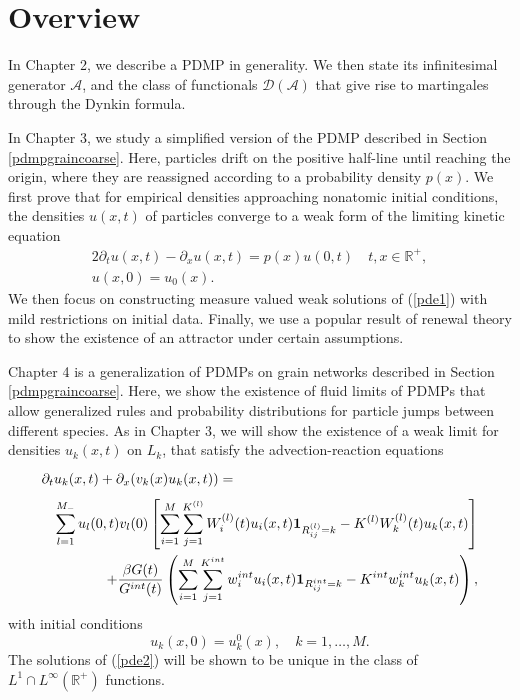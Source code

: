 \section{Overview}
 
In Chapter 2, we describe a PDMP in generality. We then state its infinitesimal generator $\mathcal A$, and the class of functionals $\mathcal D(\mathcal A)$ that give rise to martingales through the Dynkin formula.    

In Chapter 3, we  study a simplified version of the PDMP described in Section \ref{pdmpgraincoarse}. Here, particles drift on the positive half-line until reaching the origin, where they are reassigned according to a probability density $p(x)$.     We first prove that for empirical densities approaching nonatomic initial conditions, the densities $u(x,t)$ of particles converge to a weak form of the limiting kinetic equation
\begin{alignat}{2}\label{pde1}  
\partial_tu(x,t) - \partial_x u(x,t) = p(x)u(0,t) \quad t, x \in \mathbb{R}^+, \\
u(x,0) = u_0(x) . \nonumber
\end{alignat}
We then focus on constructing measure valued weak solutions of (\ref{pde1}) with mild restrictions on initial data. Finally, we use a popular result of renewal theory to show the existence of an attractor under certain assumptions.

  Chapter 4 is a generalization of PDMPs on grain networks described in Section \ref{pdmpgraincoarse}.  Here, we show the existence of fluid limits of PDMPs that allow generalized rules and probability distributions for particle jumps between different species.  As in Chapter 3, we will show the existence of a weak limit for densities $u_k(x,t)$ on $L_k$, that satisfy the advection-reaction equations
\begin{eqnarray} \label{pde2}
  \lefteqn{\partial_t u_k(x,t)+\partial_{x}(v_k(x)u_{k}(x,t))=  \phantom{u_j(x,t)\mathbf{1}_{R^{(l)}_{ij}}
-K^{(l)}W_k^{(l)}(t)u_k(x,t)}}\label{smoooth}\\
 && \sum_{l = 1}^{M_-}u_l(0,t)v_{l}(0)\left[\sum_{i = 1}^{M}\sum_{j= 1}^{K^{(l)}} W_i^{(l)}(t)u_i(x,t)\mathbf{1}_{R^{(l)}_{ij}=k}
-K^{(l)}W_k^{(l)}(t)u_k(x,t)\right]\nonumber\\ 
&&+\frac{\beta G(t)}{G^{int}(t)}\left( \sum_{i = 1}^{M}\sum_{j= 1}^{K^{int}} w^{int} _iu_{i}(x,t)\mathbf{1}_{R^{int}_{ij} = k}-K^{int}w^{int}_ku_{k}(x,t)
 \right), \nonumber
 \end{eqnarray}
 with initial conditions
 \begin{equation}
u_k(x,0) = u_{k}^0(x), \quad k = 1,\dots, M. \nonumber
\end{equation}
The solutions of (\ref{pde2}) will be shown to be unique in the class of $L^1\cap L^\infty(\mathbb R^+)$ functions.

